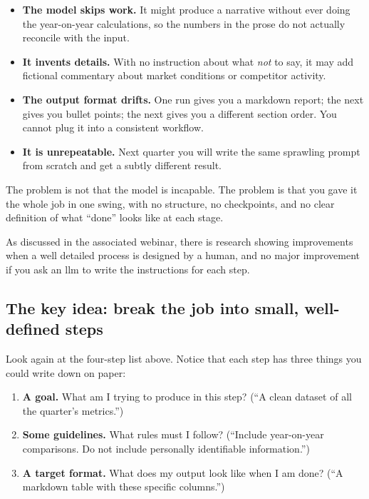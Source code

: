 \documentclass[12pt, a4paper]{article}
\begin{document}
\begin{itemize}[leftmargin=1.5em]
  \item \textbf{The model skips work.} It might produce a narrative without ever doing the year-on-year calculations, so the numbers in the prose do not actually reconcile with the input.
  \item \textbf{It invents details.} With no instruction about what \textit{not} to say, it may add fictional commentary about market conditions or competitor activity.
  \item \textbf{The output format drifts.} One run gives you a markdown report; the next gives you bullet points; the next gives you a different section order. You cannot plug it into a consistent workflow.
  \item \textbf{It is unrepeatable.} Next quarter you will write the same sprawling prompt from scratch and get a subtly different result.
\end{itemize}

The problem is not that the model is incapable. The problem is that you gave it the whole job in one swing, with no structure, no checkpoints, and no clear definition of what ``done'' looks like at each stage.

As discussed in the associated webinar, there is research showing improvements when a well detailed process is designed by a human, and no major improvement if you ask an llm to write the instructions for each step.

\subsection{The key idea: break the job into small, well-defined steps}

Look again at the four-step list above. Notice that each step has three things you could write down on paper:

\begin{enumerate}[leftmargin=1.5em]
  \item \textbf{A goal.} What am I trying to produce in this step? (``A clean dataset of all the quarter's metrics.'')
  \item \textbf{Some guidelines.} What rules must I follow? (``Include year-on-year comparisons. Do not include personally identifiable information.'')
  \item \textbf{A target format.} What does my output look like when I am done? (``A markdown table with these specific columns.'')
\end{enumerate}
\end{document}
